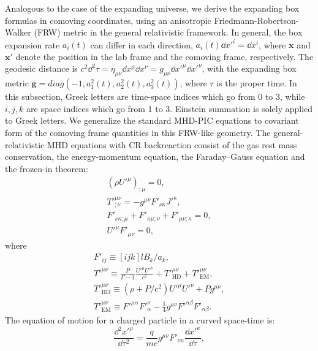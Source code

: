 \documentclass[fleqn,usenatbib]{mnras}
\begin{document}
Analogous to the case of the expanding universe, we derive the expanding box formulas in comoving coordinates, using an anisotropic Friedmann-Robertson-Walker (FRW) metric in the general relativistic framework. In general, the box expansion rate $a_i(t)$ can differ in each direction, $a_i(t) \dd x'^i =\dd x^i$, where $\boldsymbol{x}$ and $\boldsymbol{x}'$ denote the position in the lab frame and the comoving frame, respectively. The geodesic distance is $c^2 \dd^2 \tau =\eta_{\mu \nu} \dd x^\mu \dd x^\nu = g_{\mu \nu} \dd x'^\mu \dd x'^\nu$, with the expanding box metric $\mathbf{g} = diag\left(-1, a_1^2(t), a_2^2(t), a_3^2(t)\right)$, where $\tau$ is the proper time. In this subsection, Greek letters are time-space indices which go from 0 to 3, while $i, j, k$ are space indices which go from 1 to 3. Einstein summation is solely applied to Greek letters. We generalize the standard MHD-PIC equations to covariant form of the comoving frame quantities in this FRW-like geometry. The general-relativistic MHD equations with CR backreaction consist of the gas rest mass conservation, the energy-momentum equation, the Faraday–Gauss equation and the frozen-in theorem:
\begin{align}
    \left(\rho U'^\mu \right)_{;\mu} = 0, \label{equ::mass_mhd_gr} \\
	T'^{\mu \nu}_{;\nu} = - g^{\mu \nu} F'_{\nu \kappa}  J'^{\kappa}, \label{equ::energy_momentum_mhd_gr} \\
    F'_{\nu \kappa ; \mu} + F'_{\kappa \mu ;\nu} + F'_{\mu \nu; \kappa}=0, \\
    U'^\mu F'_{\mu \nu} = 0, \label{equ::frozen_in_gr} 
\end{align}
where
\begin{align*}
    F'_{ij} \equiv [ijk] l  B_k / a_k, \\
    T'^{\mu \nu} \equiv \frac{P }{\Gamma - 1} \frac{ U'^\mu U'^\nu}{c^2} + T'^{\mu \nu}_\text{HD} + T'^{\mu \nu}_\text{EM}, \\
    T'^{\mu \nu}_\text{HD} \equiv \left(\rho + P/c^2\right)U'^\mu U'^\nu + P g^{\mu \nu},\\
    T'^{\mu \nu}_\text{EM} \equiv F'^{\mu \alpha} F'^\nu_{\alpha} - \frac{1}{4} g^{\mu \nu} F'^{\alpha \beta} F'_{\alpha \beta}.
\end{align*}
The equation of motion for a charged particle in a curved space-time is:
\begin{equation}
	\frac{\dd^2 x'^\mu}{\dd \tau^2} = \frac{q}{mc} g^{\mu \nu} F'_{\nu \kappa} \frac{\dd x'^\kappa}{\dd \tau}, \label{equ::pic_dynamic_gr}
\end{equation}
\end{document}
